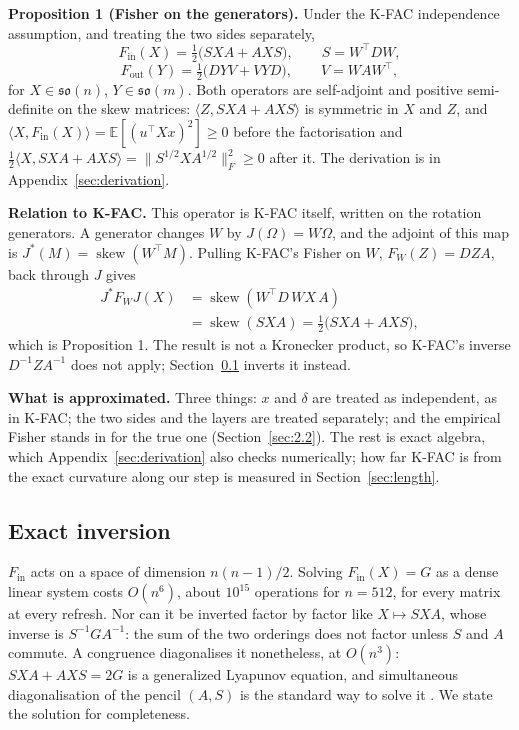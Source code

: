 \documentclass{article}
\begin{document}
\textbf{Proposition 1 (Fisher on the generators).} Under the K-FAC independence assumption, and treating
the two sides separately,
\[F_{\mathrm{in}}(X) = \tfrac12\big(S X A + A X S\big), \qquad S = W^\top D W,\]
\[F_{\mathrm{out}}(Y) = \tfrac12\big(D Y V + V Y D\big), \qquad V = W A W^\top,\]
for \(X \in \mathfrak{so}(n)\), \(Y \in \mathfrak{so}(m)\). Both operators are self-adjoint and positive
semi-definite on the skew matrices: \(\langle Z, SXA + AXS\rangle\) is symmetric in \(X\) and \(Z\), and
\(\langle X, F_{\mathrm{in}}(X)\rangle = \mathbb{E}[(u^\top X x)^2] \ge 0\) before the factorisation and
\(\tfrac12\langle X, SXA + AXS\rangle = \|S^{1/2} X A^{1/2}\|_F^2 \ge 0\) after it. The derivation is in Appendix~\ref{sec:derivation}.

\textbf{Relation to K-FAC.} This operator is K-FAC itself, written on the rotation generators. A generator
changes \(W\) by \(J(\Omega) = W\Omega\), and the adjoint of this map is \(J^*(M) = \operatorname{skew}(W^\top M)\).
Pulling K-FAC's Fisher on \(W\), \(F_W(Z) = DZA\), back through \(J\) gives
\begin{align*}
J^* F_W J(X) &= \operatorname{skew}(W^\top D\, W X\, A) \\
&= \operatorname{skew}(S X A) = \tfrac12\big(SXA + AXS\big),
\end{align*}
which is Proposition 1. The result is not a Kronecker product, so K-FAC's inverse \(D^{-1} Z A^{-1}\) does not
apply; Section~\ref{sec:inversion} inverts it instead.

\textbf{What is approximated.} Three things: \(x\) and \(\delta\) are treated as independent, as in K-FAC; the two
sides and the layers are treated separately; and the empirical Fisher stands in for the true one
(Section~\ref{sec:2.2}). The rest is exact algebra, which Appendix~\ref{sec:derivation} also checks numerically; how
far K-FAC is from the exact curvature along our step is measured in Section~\ref{sec:length}.

\subsection{Exact inversion}\label{sec:inversion}

\(F_{\mathrm{in}}\) acts on a space of dimension \(n(n-1)/2\). Solving \(F_{\mathrm{in}}(X) = G\) as a dense
linear system costs \(O(n^6)\), about \(10^{15}\) operations for \(n = 512\), for every matrix at every refresh.
Nor can it be inverted factor by factor like \(X \mapsto SXA\), whose inverse is \(S^{-1} G A^{-1}\): the sum of
the two orderings does not factor unless \(S\) and \(A\) commute. A congruence diagonalises it nonetheless, at
\(O(n^3)\): \(SXA + AXS = 2G\) is a generalized Lyapunov equation, and simultaneous diagonalisation of the pencil
\((A, S)\) is the standard way to solve it \citep{golub2013matrix,simoncini2016computational}. We state the solution for
completeness.
\end{document}

